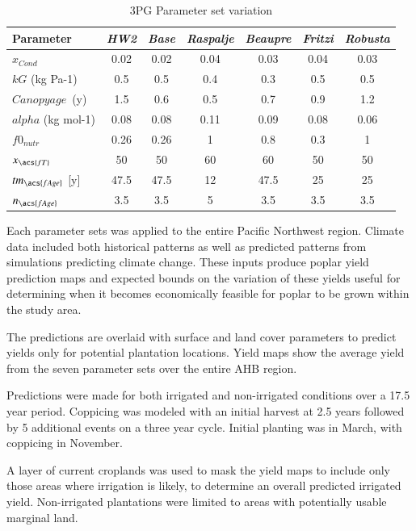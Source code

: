 \documentclass[preprint,review,12pt]{elsarticle}
\begin{document}
\begin{table}%
\caption{3PG Parameter set variation}
\begin{tabularx}{\linewidth}{|Xcccccc|}
\hline
 Parameter & \emph{HW2} & \emph{Base} & \emph{Raspalje} & \emph{Beaupre} & \emph{Fritzi} & \emph{Robusta}\\
  \hline   
  $x_{Cond}$  & 0.02 & 0.02 & 0.04 & 0.03 & 0.04 & 0.03 \\
  $kG$ (kg Pa-1) & 0.5 & 0.5 & 0.4 & 0.3 & 0.5 & 0.5 \\
  $Canopy age$~(y) & 1.5 & 0.6 & 0.5 & 0.7 & 0.9 & 1.2 \\
  $alpha$ (kg mol-1) & 0.08 & 0.08 & 0.11 & 0.09 & 0.08 & 0.06 \\
  $f0_{nutr}$  & 0.26 & 0.26 & 1 & 0.8 & 0.3 & 1 \\
  $x_{\acs{fT}}$ & 50 & 50 & 60 & 60 & 50 & 50 \\
  $tm_{\acs{fAge}}$ [y] & 47.5 & 47.5 & 12 & 47.5 & 25  & 25 \\
  $n_{\acs{fAge}}$ & 3.5 & 3.5 & 5 & 3.5 & 3.5 & 3.5 \\
  \hline
\end{tabularx}
\label{tab:3pg-tree-parameters-vary}
\end{table}

Each parameter sets was applied to the entire Pacific Northwest
region.  Climate data included both historical patterns as well as
predicted patterns from simulations predicting climate change.  These
inputs produce poplar yield prediction maps and expected bounds on the
variation of these yields useful for determining when it becomes
economically feasible for poplar to be grown within the study area.

The predictions are overlaid with surface and land cover parameters to
predict yields only for potential plantation locations.  Yield maps
show the average yield from the seven parameter sets over the entire
\ac{AHB} region.

Predictions were made for both irrigated and non-irrigated
conditions over a 17.5 year period. Coppicing was modeled with an
initial harvest at  2.5 years followed by 5 additional events on a three year cycle.
Initial planting was in March, with coppicing in November.

A layer of current croplands was used to mask the yield maps to
include only those areas where irrigation is likely, to determine an
overall predicted irrigated yield.  Non-irrigated plantations were
limited to areas with potentially usable marginal land.
\end{document}
